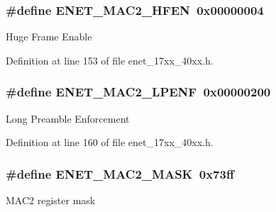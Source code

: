 \subsubsection[{\texorpdfstring{E\+N\+E\+T\+\_\+\+M\+A\+C2\+\_\+\+H\+F\+EN}{ENET_MAC2_HFEN}}]{\setlength{\rightskip}{0pt plus 5cm}\#define E\+N\+E\+T\+\_\+\+M\+A\+C2\+\_\+\+H\+F\+EN~0x00000004}\hypertarget{group__ENET__17XX__40XX_ga8937f821f7f1aa8aee29db2ade25085f}{}\label{group__ENET__17XX__40XX_ga8937f821f7f1aa8aee29db2ade25085f}
Huge Frame Enable 

Definition at line 153 of file enet\+\_\+17xx\+\_\+40xx.\+h.

\subsubsection[{\texorpdfstring{E\+N\+E\+T\+\_\+\+M\+A\+C2\+\_\+\+L\+P\+E\+NF}{ENET_MAC2_LPENF}}]{\setlength{\rightskip}{0pt plus 5cm}\#define E\+N\+E\+T\+\_\+\+M\+A\+C2\+\_\+\+L\+P\+E\+NF~0x00000200}\hypertarget{group__ENET__17XX__40XX_gaa1c082cfc7d20fb9683a0a17c355fccf}{}\label{group__ENET__17XX__40XX_gaa1c082cfc7d20fb9683a0a17c355fccf}
Long Preamble Enforcement 

Definition at line 160 of file enet\+\_\+17xx\+\_\+40xx.\+h.

\subsubsection[{\texorpdfstring{E\+N\+E\+T\+\_\+\+M\+A\+C2\+\_\+\+M\+A\+SK}{ENET_MAC2_MASK}}]{\setlength{\rightskip}{0pt plus 5cm}\#define E\+N\+E\+T\+\_\+\+M\+A\+C2\+\_\+\+M\+A\+SK~0x73ff}\hypertarget{group__ENET__17XX__40XX_ga090fe0a3c430ad527911dd8948323e56}{}\label{group__ENET__17XX__40XX_ga090fe0a3c430ad527911dd8948323e56}
M\+A\+C2 register mask 

